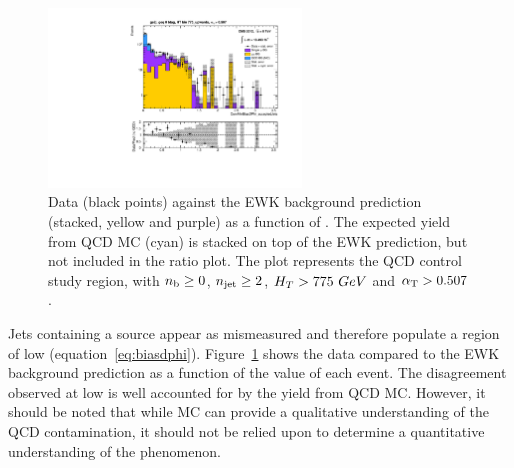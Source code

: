 \begin{figure}[t]
  \centering
  \includegraphics[width=0.6\textwidth]
  {Figs/datapred/qcd_study_region/ge2j_ge0b_775_upwards/Prediction_ComMinBiasDPhi_acceptedJets_all_775_upwards_QCD}
  \caption{Data (black points) against the EWK background prediction 
  (stacked, yellow and purple) as a function of \mindphistar. The expected yield
  from QCD MC (cyan) is stacked on top of the EWK prediction, but not included
  in the ratio plot. The plot represents
  the QCD control study region, with $n_{\text{b}} \geq 0$, $n_{\text{jet}} \geq 2$, $H_T > 775
 ~GeV$ and $\alpha_{\text{T}} > 0.507$.}
  \label{fig:qcd_region_pred_dphistar_incl}
\end{figure}

Jets containing a \met source appear as mismeasured and therefore
populate a region of low \dphistar (equation~\ref{eq:biasdphi}).
Figure~\ref{fig:qcd_region_pred_dphistar_incl} shows the data compared to the
EWK background prediction
as a function of the \mindphistar value of each event. The disagreement observed
at low \mindphistar is well accounted for by the yield from QCD MC. However, it
should be noted that while MC can provide a qualitative understanding of the QCD
contamination, it should not be relied upon to determine a quantitative
understanding of the phenomenon.

